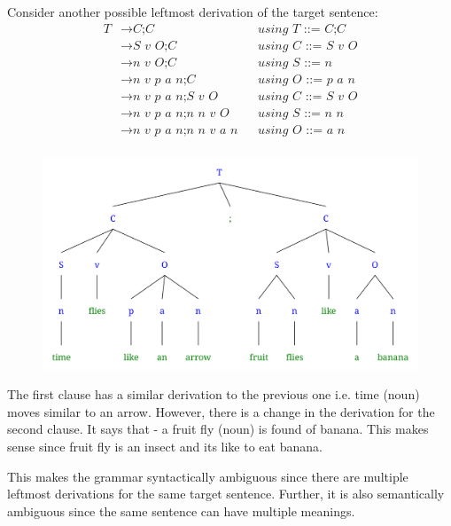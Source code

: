 \documentclass{article}
\begin{document}
    Consider another possible leftmost derivation of the target sentence:
    \begin{align*}
        T   & \rightarrow \textit{C;C}               && \textit{using T ::= C;C}     \\
            & \rightarrow \textit{S v O;C}           && \textit{using C ::= S v O}   \\
            & \rightarrow \textit{n v O;C}           && \textit{using S ::= n}       \\
            & \rightarrow \textit{n v p a n;C}       && \textit{using O ::= p a n}   \\
            & \rightarrow \textit{n v p a n;S v O}   && \textit{using C ::= S v O}   \\
            & \rightarrow \textit{n v p a n;n n v O} && \textit{using S ::= n n}   \\
            & \rightarrow \textit{n v p a n;n n v a n} && \textit{using O ::= a n} \\
    \end{align*}

    \begin{figure}[H]
        \includegraphics[width=1\textwidth]{hw2-3q2.png}
    \end{figure}

    The first clause has a similar derivation to the previous one i.e. time (noun) moves similar to an arrow. However, there is a change in the derivation for the second clause. It says that - a fruit fly (noun) is found of banana. This makes sense since fruit fly is an insect and its like to eat banana.

    This makes the grammar syntactically ambiguous since there are multiple leftmost derivations for the same target sentence. Further, it is also semantically ambiguous since the same sentence can have multiple meanings.
\end{document}
